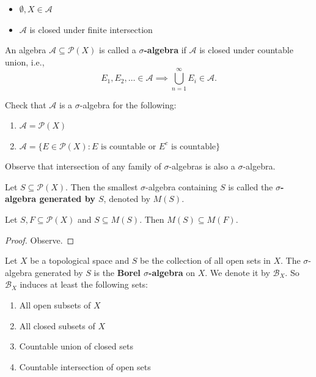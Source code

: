 \documentclass{functionspaces}
\begin{document}
\begin{remark}
\begin{itemize}
    \item \( \emptyset, X \in \mathcal{A} \)
    \item \( \mathcal{A} \) is closed under finite intersection
\end{itemize}
\end{remark}

\begin{definition}
An algebra \( \mathcal{A} \subseteq \mathcal{P}(X) \) is called a \textbf{$\sigma$-algebra} if \( \mathcal{A} \) is closed under countable union, i.e.,
\[
E_{1},E_{2},\ldots \in \mathcal{A} \implies \bigcup_{n=1}^{\infty} E_{i} \in \mathcal{A}.
\]
\end{definition}

\begin{example}
Check that \( \mathcal{A} \) is a \(\sigma\)-algebra for the following:
\begin{enumerate}
    \item \( \mathcal{A} = \mathcal{P}(X) \)
    \item \( \mathcal{A} = \{E \in \mathcal{P}(X) : E \text{ is countable or } E^{c} \text{ is countable}\} \)
\end{enumerate}
Observe that intersection of any family of \(\sigma\)-algebras is also a \(\sigma\)-algebra.
\end{example}

\begin{definition}
Let \( S \subseteq \mathcal{P}(X) \). Then the smallest \(\sigma\)-algebra containing \( S \) is called the \textbf{$\sigma$-algebra generated by $S$}, denoted by \( M(S) \).
\end{definition}

\begin{lemma}
Let \( S, F \subseteq \mathcal{P}(X) \) and \( S \subseteq M(S) \). Then \( M(S) \subseteq M(F) \).
\end{lemma}

\begin{proof}
Observe.
\end{proof}

\begin{definition}
Let \( X \) be a topological space and \( S \) be the collection of all open sets in \( X \). The \(\sigma\)-algebra generated by \( S \) is the \textbf{Borel $\sigma$-algebra} on \( X \). We denote it by \( \mathcal{B}_{X} \). So \( \mathcal{B}_{X} \) induces at least the following sets:
\begin{enumerate}
    \item All open subsets of \( X \)
    \item All closed subsets of \( X \)
    \item Countable union of closed sets
    \item Countable intersection of open sets
\end{enumerate}
\end{definition}
\end{document}
